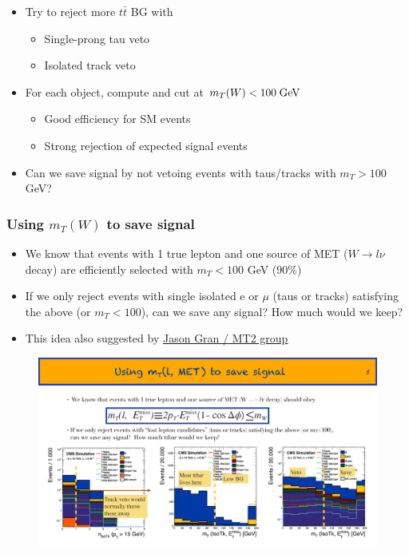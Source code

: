 \documentclass{beamer}
\begin{document}
\begin{frame}
\begin{columns}[c]
\begin{figure}
    \end{figure}
  \end{columns}
  \begin{itemize}
  \item Try to reject more $t\bar{t}$ \wpj BG with
    \begin{itemize}
    \item Single-prong tau veto
    \item Isolated track veto
    \end{itemize}
  \item For each object, compute and cut at $m_T(W) <100 \;\text{Ge}\kern-0.06667em\text{V}$
  \begin{itemize}
   \item Good efficiency for SM events
   \item Strong rejection of expected signal events
  \end{itemize}

  \item Can we save signal by not vetoing events with taus/tracks
    with $m_T>100$ GeV?
  \end{itemize}
\end{frame}

\begin{frame}
  \frametitle{Using $m_T(W)$ to save signal}
  \begin{itemize}
  \item We know that events with 1 true lepton and one source of MET
    ($W\rightarrow l\nu$ decay) are efficiently selected with $m_T<100$ GeV (90\%)
  \item If we only reject events with single isolated e or $\mu$ (taus or
    tracks) satisfying the above (or $m_T<100$), can we save any signal?
    How much \ttbar \wpj would we keep?
  \item This idea also suggested by \href{https://indico.cern.ch/event/339666/session/2/contribution/50/material/slides/0.pdf}{Jason Gran / MT2 group}
  \end{itemize}
  \begin{figure}[h]
    \centering
    \includegraphics[width=\textwidth]{figures/jacks_Studies/mTIsoTracks}
  \end{figure}
\end{frame}
\end{document}
